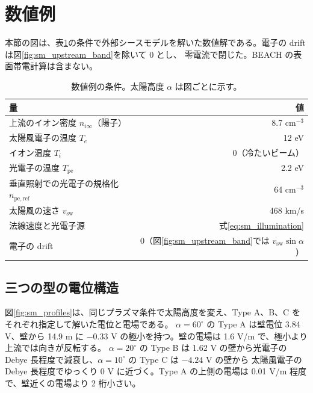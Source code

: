 \section{数値例}
\label{sec:sm_examples}
本節の図は、表\ref{tab:sm_example_inputs}の条件で外部シースモデルを解いた数値解である。電子の drift は図\ref{fig:sm_upstream_band}を除いて 0 とし、
零電流で閉じた。BEACH の表面帯電計算は含まない。

\begin{table}[htbp]
\centering
\caption{数値例の条件。太陽高度 $\alpha$ は図ごとに示す。}
\label{tab:sm_example_inputs}
\begin{tabular}{lr}
\toprule
量 & 値 \\
\midrule
上流のイオン密度 $n_{i\infty}$（陽子） & 8.7 cm$^{-3}$ \\
太陽風電子の温度 $T_e$ & 12 eV \\
イオン温度 $T_i$ & 0（冷たいビーム） \\
光電子の温度 $T_{\mathrm{pe}}$ & 2.2 eV \\
垂直照射での光電子の規格化 $n_{\mathrm{pe,ref}}$ & 64 cm$^{-3}$ \\
太陽風の速さ $v_{\mathrm{sw}}$ & 468 km/s \\
法線速度と光電子源 & 式\eqref{eq:sm_illumination} \\
電子の drift & 0（図\ref{fig:sm_upstream_band}では $v_{\mathrm{sw}}\sin\alpha$） \\
\bottomrule
\end{tabular}
\end{table}

\subsection{三つの型の電位構造}
図\ref{fig:sm_profiles}は、同じプラズマ条件で太陽高度を変え、Type A、B、C をそれぞれ指定して解いた電位と電場である。
$\alpha=60^\circ$ の Type A は壁電位 3.84 V、壁から 14.9 m に $-0.33$ V の極小を持つ。壁の電場は 1.6 V/m で、極小より上流では向きが反転する。
$\alpha=20^\circ$ の Type B は 1.62 V の壁から光電子の Debye 長程度で減衰し、$\alpha=10^\circ$ の Type C は $-4.24$ V の壁から
太陽風電子の Debye 長程度でゆっくり 0 V に近づく。Type A の上側の電場は 0.01 V/m 程度で、壁近くの電場より 2 桁小さい。



